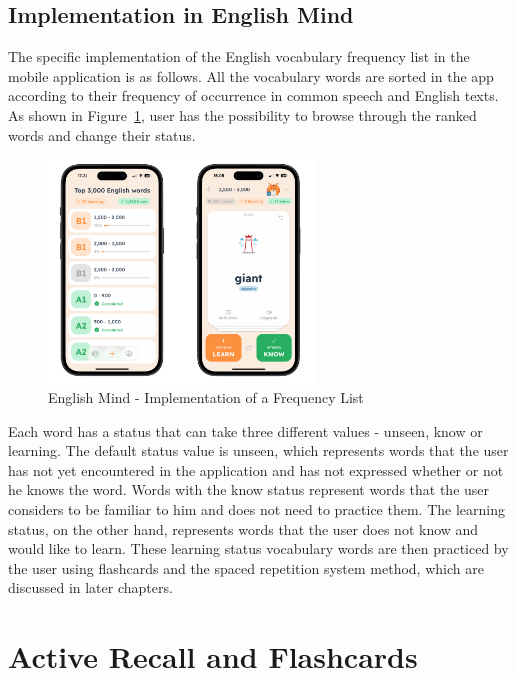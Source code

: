 \subsection*{Implementation in English Mind}

The specific implementation of the English vocabulary frequency list in the mobile application is as follows. All the vocabulary words are sorted in the app according to their frequency of occurrence in common speech and English texts. As shown in Figure~\ref{fig:em-frequency-list}, user has the possibility to browse through the ranked words and change their status. 

\begin{figure}[!h]
    \includegraphics[width=0.63\textwidth]{src/figures/em-frequency-list.png}
    \caption{English Mind - Implementation of a Frequency List}
    \label{fig:em-frequency-list}
\end{figure}

Each word has a status that can take three different values - unseen, know or learning. The default status value is unseen, which represents words that the user has not yet encountered in the application and has not expressed whether or not he knows the word. Words with the know status represent words that the user considers to be familiar to him and does not need to practice them. The learning status, on the other hand, represents words that the user does not know and would like to learn. These learning status vocabulary words are then practiced by the user using flashcards and the spaced repetition system method, which are discussed in later chapters.

\section{Active Recall and Flashcards}

